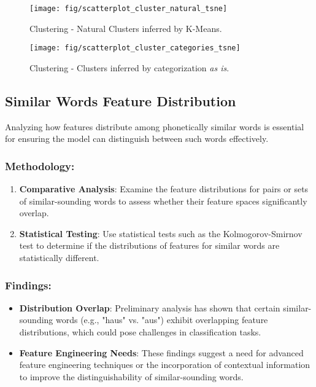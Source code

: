 \begin{figure}[!ht]
	\centering
	\begin{minipage}{0.49\textwidth}
		\centering
		\texttt{[image: fig/scatterplot\_cluster\_natural\_tsne]}
		\caption{Clustering - Natural Clusters inferred by K-Means.}
		\label{fig:ClusterNatural}
	\end{minipage}\hfill
	\begin{minipage}{0.49\textwidth}
		\centering
		\texttt{[image: fig/scatterplot\_cluster\_categories\_tsne]}
		\caption{Clustering - Clusters inferred by categorization \textit{as is}.}
		\label{fig:ClusterCategorized}
	\end{minipage}
\end{figure}


\subsection{Similar Words Feature Distribution}

Analyzing how features distribute among phonetically similar words is essential for ensuring the model can distinguish between such words effectively.

\subsubsection{Methodology:}

\begin{enumerate}
    \item \textbf{Comparative Analysis}: Examine the feature distributions for pairs or sets of similar-sounding words to assess whether their feature spaces significantly overlap.
    \item \textbf{Statistical Testing}: Use statistical tests such as the Kolmogorov-Smirnov test to determine if the distributions of features for similar words are statistically different.
\end{enumerate}

\subsubsection{Findings:}

\begin{itemize}
    \item \textbf{Distribution Overlap}: Preliminary analysis has shown that certain similar-sounding words (e.g., "haus" vs. "aus") exhibit overlapping feature distributions, which could pose challenges in classification tasks.
    \item \textbf{Feature Engineering Needs}: These findings suggest a need for advanced feature engineering techniques or the incorporation of contextual information to improve the distinguishability of similar-sounding words.
\end{itemize}
